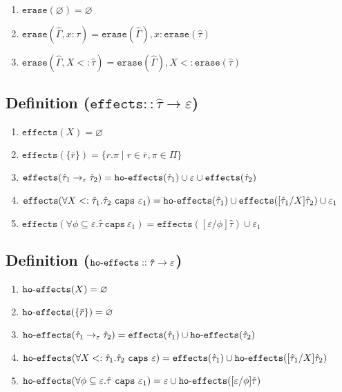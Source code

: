 \documentclass{llncs}
\newcommand{\keywadj}[1]{\mathtt{#1}}
\newcommand{\keyw}[1]{\keywadj{#1}~}
\newcommand{\kw}[1]{\keyw{ #1 }}
\newcommand{\kwa}[1]{\keywadj{ #1 }}
\newcommand{\hyphen}{\hbox{-}}
\newcommand{\fx}[1]{ \kwa{effects}(#1) }
\newcommand{\hofx}[1]{ \kwa{ho \hyphen effects}(#1) }
\newcommand{\erase}[1]{
	\keywadj{erase}(#1)
}
\newcommand{\polycap}[3]{
	\forall #1. #2~ \kw{caps} #3
}
\begin{document}
\begin{enumerate}
	\item $\erase{\varnothing} = \varnothing$
	\item $\erase{\hat \Gamma, x: \hat \tau} = \erase{\hat \Gamma}, x: \erase{\hat \tau}$
	\item $\erase{\hat \Gamma, X <: \hat \tau} = \erase{\hat \Gamma}, X <: \erase{\hat \tau}$
\end{enumerate}


\subsection*{Definition ($\kwa{effects :: \hat \tau \rightarrow \varepsilon}$)}

\begin{enumerate}
	\item $\fx{X} = \varnothing$
	\item $\fx{\{ \bar r \}} = \{ r.\pi \mid r \in \bar r, \pi \in \Pi \}$
	\item $\fx{\hat \tau_1 \rightarrow_{\varepsilon} \hat \tau_2} = \kwa{ho \hyphen effects}(\hat \tau_1) \cup \varepsilon \cup \kwa{effects}(\hat \tau_2)$
	\item $\fx{\polycap{X <: \hat \tau_1}{\hat \tau_2}{\varepsilon_1}} = \hofx{\hat \tau_1} \cup \fx{[\hat \tau_1/X]\hat \tau_2} \cup \varepsilon_1$
	\item $\fx{\polycap{\phi \subseteq \varepsilon}{\hat \tau}{\varepsilon_1}} = \fx{[\varepsilon/\phi]\hat \tau} \cup \varepsilon_1$
\end{enumerate}

\subsection*{Definition ($\kwa{ho \hyphen effects :: \hat \tau \rightarrow \varepsilon}$)}

\begin{enumerate}
	\item $\hofx{X} = \varnothing$
	\item $\hofx{\{ \bar r \}} = \varnothing$
	\item $\hofx{\hat \tau_1 \rightarrow_{\varepsilon} \hat \tau_2} = \kwa{effects}(\hat \tau_1) \cup \kwa{ho \hyphen effects}(\hat \tau_2)$
	\item $\hofx{\polycap{X <: \hat \tau_1}{\hat \tau_2}{\varepsilon}} = \fx{\hat \tau_1} \cup \hofx{[\hat \tau_1/X]\hat \tau_2}$
	\item $\hofx{\polycap{\phi \subseteq \varepsilon}{\hat \tau}{\varepsilon_1}} = \varepsilon \cup \hofx{[\varepsilon/\phi]\hat \tau}$
\end{enumerate}
\end{document}
